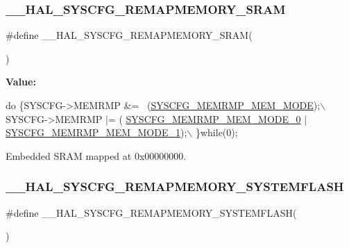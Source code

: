 \subsubsection{\texorpdfstring{\+\_\+\+\_\+\+H\+A\+L\+\_\+\+S\+Y\+S\+C\+F\+G\+\_\+\+R\+E\+M\+A\+P\+M\+E\+M\+O\+R\+Y\+\_\+\+S\+R\+AM}{\_\_HAL\_SYSCFG\_REMAPMEMORY\_SRAM}}
{\footnotesize\ttfamily \#define \+\_\+\+\_\+\+H\+A\+L\+\_\+\+S\+Y\+S\+C\+F\+G\+\_\+\+R\+E\+M\+A\+P\+M\+E\+M\+O\+R\+Y\+\_\+\+S\+R\+AM(\begin{DoxyParamCaption}{ }\end{DoxyParamCaption})}

{\bfseries Value\+:}
\begin{DoxyCode}
\textcolor{keywordflow}{do} \{SYSCFG->MEMRMP &= ~(\hyperlink{group___peripheral___registers___bits___definition_ga3c05039ec67573c00da29f58b914f258}{SYSCFG\_MEMRMP\_MEM\_MODE});\(\backslash\)
                                                  SYSCFG->MEMRMP |= (
      \hyperlink{group___peripheral___registers___bits___definition_ga30d5f406535f94faea2e7f924d50201b}{SYSCFG\_MEMRMP\_MEM\_MODE\_0} | \hyperlink{group___peripheral___registers___bits___definition_gab5d76e8b4d801b35c31ef352b33407be}{SYSCFG\_MEMRMP\_MEM\_MODE\_1});\(\backslash\)
                                                 \}\textcolor{keywordflow}{while}(0);
\end{DoxyCode}


Embedded S\+R\+AM mapped at 0x00000000. 

\mbox{\label{group___h_a_l___exported___macros_ga59782d94690fd538b25def536c81c3ed}} 
\subsubsection{\texorpdfstring{\+\_\+\+\_\+\+H\+A\+L\+\_\+\+S\+Y\+S\+C\+F\+G\+\_\+\+R\+E\+M\+A\+P\+M\+E\+M\+O\+R\+Y\+\_\+\+S\+Y\+S\+T\+E\+M\+F\+L\+A\+SH}{\_\_HAL\_SYSCFG\_REMAPMEMORY\_SYSTEMFLASH}}
{\footnotesize\ttfamily \#define \+\_\+\+\_\+\+H\+A\+L\+\_\+\+S\+Y\+S\+C\+F\+G\+\_\+\+R\+E\+M\+A\+P\+M\+E\+M\+O\+R\+Y\+\_\+\+S\+Y\+S\+T\+E\+M\+F\+L\+A\+SH(\begin{DoxyParamCaption}{ }\end{DoxyParamCaption})}


